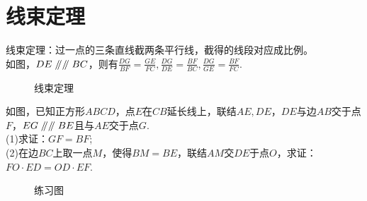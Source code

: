 \section{线束定理}
\begin{definition}
    线束定理：过一点的三条直线截两条平行线，截得的线段对应成比例。\\
    如图，$DE\mathrel{/\mkern-5mu/} \mathrel{/\mkern-5mu/} BC$，则有$\frac{DG}{BF}=\frac{GE}{FC},\frac{DG}{DE}=\frac{BF}{BC},\frac{DG}{GE}=\frac{BF}{FC}.$
\end{definition}
\begin{figure}[H]
    \centering
    \resizebox{4cm}{!}{}
    \caption{线束定理}
\end{figure}
\begin{problem}
如图，已知正方形$ABCD$，点$E$在$CB$延长线上，联结$AE,DE$，$DE$与边$AB$交于点$F$，$EG\mathrel{/\mkern-5mu/} \mathrel{/\mkern-5mu/} BE$且与$AE$交于点$G.$ \\
(1)求证：$GF=BF$; \\
(2)在边$BC$上取一点$M$，使得$BM=BE$，联结$AM$交$DE$于点$O$，求证：$FO·ED=OD·EF.$ \\
\end{problem}
\begin{figure}[H]
    \centering
    \resizebox{4cm}{!}{}
    \caption{练习图}
\end{figure}
\clearpage
